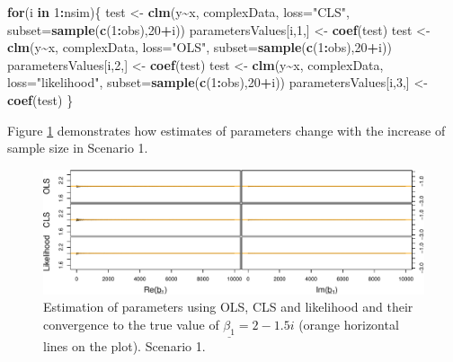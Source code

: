 \documentclass[
]{book}
\newenvironment{Shaded}{\begin{snugshade}}{\end{snugshade}}
\newcommand{\ControlFlowTok}[1]{\textcolor[rgb]{0.13,0.29,0.53}{\textbf{#1}}}
\newcommand{\DataTypeTok}[1]{\textcolor[rgb]{0.13,0.29,0.53}{#1}}
\newcommand{\DecValTok}[1]{\textcolor[rgb]{0.00,0.00,0.81}{#1}}
\newcommand{\KeywordTok}[1]{\textcolor[rgb]{0.13,0.29,0.53}{\textbf{#1}}}
\newcommand{\NormalTok}[1]{#1}
\newcommand{\OperatorTok}[1]{\textcolor[rgb]{0.81,0.36,0.00}{\textbf{#1}}}
\newcommand{\StringTok}[1]{\textcolor[rgb]{0.31,0.60,0.02}{#1}}
\begin{document}
\begin{Shaded}
\begin{Highlighting}[]
\ControlFlowTok{for}\NormalTok{(i }\ControlFlowTok{in} \DecValTok{1}\OperatorTok{:}\NormalTok{nsim)\{}
\NormalTok{    test \textless{}{-}}\StringTok{ }\KeywordTok{clm}\NormalTok{(y}\OperatorTok{\textasciitilde{}}\NormalTok{x, complexData, }\DataTypeTok{loss=}\StringTok{"CLS"}\NormalTok{,}
                \DataTypeTok{subset=}\KeywordTok{sample}\NormalTok{(}\KeywordTok{c}\NormalTok{(}\DecValTok{1}\OperatorTok{:}\NormalTok{obs),}\DecValTok{20}\OperatorTok{+}\NormalTok{i))}
\NormalTok{    parametersValues[i,}\DecValTok{1}\NormalTok{,] \textless{}{-}}\StringTok{ }\KeywordTok{coef}\NormalTok{(test)}
\NormalTok{    test \textless{}{-}}\StringTok{ }\KeywordTok{clm}\NormalTok{(y}\OperatorTok{\textasciitilde{}}\NormalTok{x, complexData, }\DataTypeTok{loss=}\StringTok{"OLS"}\NormalTok{,}
                \DataTypeTok{subset=}\KeywordTok{sample}\NormalTok{(}\KeywordTok{c}\NormalTok{(}\DecValTok{1}\OperatorTok{:}\NormalTok{obs),}\DecValTok{20}\OperatorTok{+}\NormalTok{i))}
\NormalTok{    parametersValues[i,}\DecValTok{2}\NormalTok{,] \textless{}{-}}\StringTok{ }\KeywordTok{coef}\NormalTok{(test)}
\NormalTok{    test \textless{}{-}}\StringTok{ }\KeywordTok{clm}\NormalTok{(y}\OperatorTok{\textasciitilde{}}\NormalTok{x, complexData, }\DataTypeTok{loss=}\StringTok{"likelihood"}\NormalTok{,}
                \DataTypeTok{subset=}\KeywordTok{sample}\NormalTok{(}\KeywordTok{c}\NormalTok{(}\DecValTok{1}\OperatorTok{:}\NormalTok{obs),}\DecValTok{20}\OperatorTok{+}\NormalTok{i))}
\NormalTok{    parametersValues[i,}\DecValTok{3}\NormalTok{,] \textless{}{-}}\StringTok{ }\KeywordTok{coef}\NormalTok{(test)}
\NormalTok{\}}
\end{Highlighting}
\end{Shaded}

Figure \ref{fig:parametersUCDV} demonstrates how estimates of parameters change with the increase of sample size in Scenario 1.

\begin{figure}
\centering
\includegraphics{Svetunkov---Svetunkov---Complex-Valued-Econometrics_files/figure-latex/parametersUCDV-1.pdf}
\caption{\label{fig:parametersUCDV}Estimation of parameters using OLS, CLS and likelihood and their convergence to the true value of \(\underline{\beta_1}=2-1.5i\) (orange horizontal lines on the plot). Scenario 1.}
\end{figure}
\end{document}

